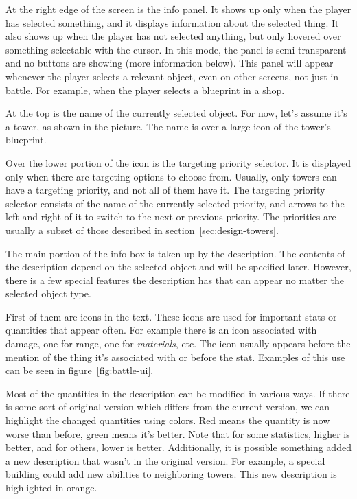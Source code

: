 At the right edge of the screen is the info panel.
It shows up only when the player has selected something, and it displays information about the selected thing.
It also shows up when the player has not selected anything, but only hovered over something selectable with the cursor.
In this mode, the panel is semi-transparent and no buttons are showing (more information below).
This panel will appear whenever the player selects a relevant object, even on other screens, not just in battle.
For example, when the player selects a blueprint in a shop.

At the top is the name of the currently selected object.
For now, let's assume it's a tower, as shown in the picture.
The name is over a large icon of the tower's blueprint.

Over the lower portion of the icon is the targeting priority selector.
It is displayed only when there are targeting options to choose from.
Usually, only towers can have a targeting priority, and not all of them have it.
The targeting priority selector consists of the name of the currently selected priority, and arrows to the left and right of it to switch to the next or previous priority.
The priorities are usually a subset of those described in section~\ref{sec:design-towers}.

The main portion of the info box is taken up by the description.
The contents of the description depend on the selected object and will be specified later.
However, there is a few special features the description has that can appear no matter the selected object type.

First of them are icons in the text.
These icons are used for important stats or quantities that appear often.
For example there is an icon associated with damage, one for range, one for \emph{materials}, etc.
The icon usually appears before the mention of the thing it's associated with or before the stat.
Examples of this use can be seen in figure~\ref{fig:battle-ui}.

Most of the quantities in the description can be modified in various ways.
If there is some sort of original version which differs from the current version, we can highlight the changed quantities using colors.
Red means the quantity is now worse than before, green means it's better.
Note that for some statistics, higher is better, and for others, lower is better.
Additionally, it is possible something added a new description that wasn't in the original version.
For example, a special building could add new abilities to neighboring towers.
This new description is highlighted in orange.

